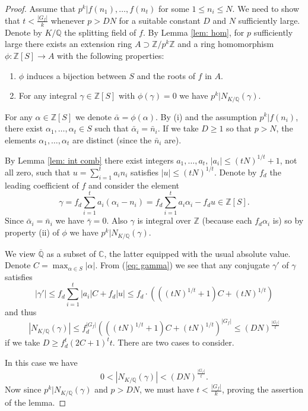 \documentclass[10pt,a4paper]{amsart}
\newcommand{\C}{{\mathbb C}}
\newcommand{\Qb}{{\overline{\Q}}}
\newcommand{\Q}{{\mathbb Q}}
\newcommand{\Z}{{\mathbb Z}}
\newcommand{\case}[1]{\vspace{0.3cm}\noindent\framebox{#1.}}
\begin{document}
\begin{proof} 
Assume that $p^k|f(n_1),\ldots,f(n_t)$ for some $1\le n_i\le N$. We need to show that $t<\frac{|G_f|}k$ whenever $p>DN$ for a suitable constant $D$ and $N$ sufficiently large. Denote by $K/\Q$ the splitting field of $f$. By Lemma \ref{lem: hom}, for $p$ sufficiently large there exists an extension ring $A\supset \Z/p^k\Z$ and a ring homomorphism $\phi:\Z[S]\to A$ with the following properties:
\begin{enumerate}
    \item[(i)] $\phi$ induces a bijection between $S$ and the roots of $f$ in $A$.
    \item[(ii)] For any integral $\gamma\in\Z[S]$ with $\phi(\gamma)=0$ we have $p^k|N_{K/\Q}(\gamma)$.
\end{enumerate}
For any $\alpha\in\Z[S]$ we denote $\bar\alpha=\phi(\alpha)$.
By (i) and the assumption $p^k|f(n_i)$, there exist $\alpha_1,\ldots,\alpha_t\in S$ such that $\bar\alpha_i=\bar n_i$. If we take $D\ge 1$ so that $p>N$, the elements $\alpha_1,\ldots,\alpha_t$ are distinct (since the $\bar n_i$ are). 

 By Lemma \ref{lem: int comb} there exist integers $a_1,\ldots,a_t,\,|a_i|\le (tN)^{1/t}+1$, not all zero, such that $u=\sum_{i=1}^ta_in_i$ satisfies $|u|\le (tN)^{1/t}$. 
Denote by $f_d$ the leading coefficient of $f$ and consider the element
\begin{equation}\label{eq: gamma}\gamma=f_d\sum_{i=1}^ta_i(\alpha_i-n_i)=f_d\sum_{i=1}^t a_i\alpha_i-f_du\in\Z[S].\end{equation}
Since $\bar\alpha_i=\bar n_i$ we have $\bar\gamma=0$. Also $\gamma$ is integral over $\Z$ (because each $f_d\alpha_i$ is) so by property (ii) of $\phi$ we have $p^k|N_{K/\Q}(\gamma).$
 
 We view $\Qb$ as a subset of $\C$, the latter equipped with the usual absolute value. Denote $C=\max_{\alpha\in S}|\alpha|$.
 From (\ref{eq: gamma}) we see that any conjugate $\gamma'$ of $\gamma$ satisfies
 $$|\gamma'|\le f_d\sum_{i=1}^t|a_i|C+f_d|u|\le f_d\cdot\left(((tN)^{1/t}+1)C+(tN)^{1/t}\right)$$ and thus
$$|N_{K/\Q}(\gamma)|\le f_d^{|G_f|}(((tN)^{1/t}+1)C+(tN)^{1/t})^{|G_f|}\le (DN)^{\frac{|G_f|}{t}}$$ if we take $D\ge f_d^t(2C+1)^tt$.
 There are two cases to consider.

\case{$\gamma\neq 0$} In this case we have 
$$0<|N_{K/\Q}(\gamma)|<(DN)^{\frac{|G_f|}t}.$$ 
Now since $p^k|N_{K/\Q}(\gamma)$
and $p>DN$, we must have $t<\frac{|G_f|}k$, proving the assertion of the lemma.


\end{proof}
\end{document}
